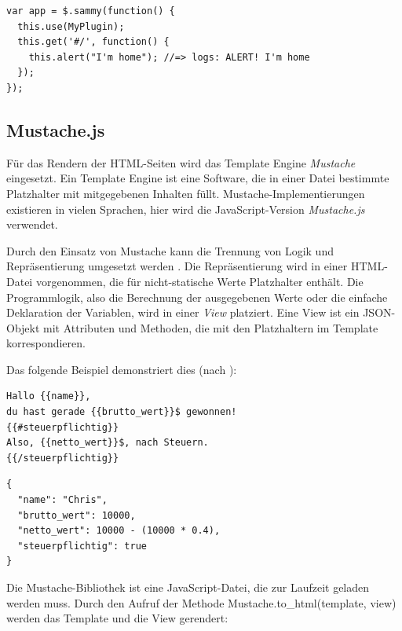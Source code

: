 \medskip
\begin{lstlisting}[caption=Sammy.js: Einbinden des Plugins]
var app = $.sammy(function() {
  this.use(MyPlugin);
  this.get('#/', function() {
    this.alert("I'm home"); //=> logs: ALERT! I'm home
  });
});
\end{lstlisting}



\subsection{Mustache.js}
\label{subsec:mustache}

Für das Rendern der HTML-Seiten wird das Template Engine \textit{Mustache} \cite{mustache:homepage} eingesetzt. Ein Template Engine ist eine Software, die in einer Datei bestimmte Platzhalter mit mitgegebenen Inhalten füllt. Mustache-Implementierungen existieren in vielen Sprachen, hier wird die JavaScript-Version \textit{Mustache.js} verwendet.

Durch den Einsatz von Mustache kann die Trennung von Logik und Repräsentierung umgesetzt werden \cite{mustache:couchio}. Die Repräsentierung wird in einer HTML-Datei vorgenommen, die für nicht-statische Werte Platzhalter enthält. Die Programmlogik, also die Berechnung der ausgegebenen Werte oder die einfache Deklaration der Variablen, wird in einer \textit{View} platziert. Eine View ist ein JSON-Objekt mit Attributen und Methoden, die mit den Platzhaltern im Template korrespondieren.

Das folgende Beispiel demonstriert dies (nach \cite{mustache:other}):

\medskip
\begin{lstlisting}[caption=Mustache.js: Beispiel f\"ur ein Template]
Hallo {{name}},
du hast gerade {{brutto_wert}}$ gewonnen!
{{#steuerpflichtig}}
Also, {{netto_wert}}$, nach Steuern.
{{/steuerpflichtig}}
\end{lstlisting}


\medskip
\begin{lstlisting}[caption=Mustache.js: \"Ubergebene View, label=lst:mustache]
{
  "name": "Chris",
  "brutto_wert": 10000,
  "netto_wert": 10000 - (10000 * 0.4),
  "steuerpflichtig": true
}
\end{lstlisting}

Die Mustache-Bibliothek ist eine JavaScript-Datei, die zur Laufzeit geladen werden muss. Durch den Aufruf der Methode {\selectfont Mustache.to\_html(template, view)} werden das Template und die View gerendert:

